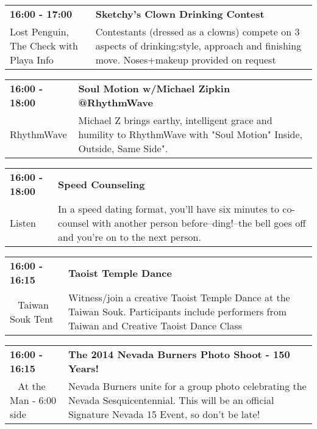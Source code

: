 \begin{tabular}{ p{1in} p{2.2in} }
    \textbf{16:00 - 17:00} & \textbf{Sketchy's Clown Drinking Contest} \\
    Lost Penguin, The \newline Check with Playa Info & Contestants (dressed as a clowns) compete on 3 aspects of drinking:style, approach and finishing move.  Noses+makeup provided on request \\
    \hline 
\end{tabular}
    
\begin{tabular}{ p{1in} p{2.2in} }
    \textbf{16:00 - 18:00} & \textbf{Soul Motion w/Michael Zipkin @RhythmWave} \\
    RhythmWave \newline  & Michael Z brings earthy, intelligent grace and humility to RhythmWave with "Soul Motion" Inside, Outside, Same Side". \\
    \hline 
\end{tabular}
    
\begin{tabular}{ p{1in} p{2.2in} }
    \textbf{16:00 - 18:00} & \textbf{Speed Counseling} \\
    Listen \newline  & In a speed dating format, you'll have six minutes to co-counsel with another person before--ding!--the bell goes off and you're on to the next person. \\
    \hline 
\end{tabular}
    
\begin{tabular}{ p{1in} p{2.2in} }
    \textbf{16:00 - 16:15} & \textbf{Taoist Temple Dance} \\
    ~ \newline Taiwan Souk Tent & Witness/join a creative Taoist Temple Dance at the Taiwan Souk. Participants include performers from Taiwan and Creative Taoist Dance Class \\
    \hline 
\end{tabular}
    
\begin{tabular}{ p{1in} p{2.2in} }
    \textbf{16:00 - 16:15} & \textbf{The 2014 Nevada Burners Photo Shoot - 150 Years!} \\
    ~ \newline At the Man - 6:00 side & Nevada Burners unite for a group photo celebrating the Nevada Sesquicentennial. This will be an official Signature Nevada 15 Event, so don't be late! \\
    \hline 
\end{tabular}
    
